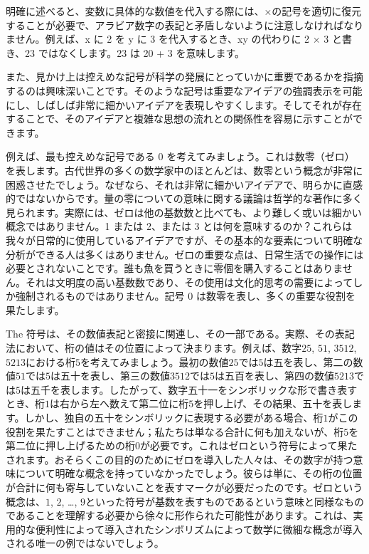 \documentclass[a4paper,11pt,openany]{ltjsbook}
\begin{document}
明確に述べると、変数に具体的な数値を代入する際には、×の記号を適切に復元することが必要で、アラビア数字の表記と矛盾しないように注意しなければなりません。例えば、x に 2 を y に 3 を代入するとき、xy の代わりに 2 × 3 と書き、23 ではなくします。23 は 20 + 3 を意味します。

また、見かけ上は控えめな記号が科学の発展にとっていかに重要であるかを指摘するのは興味深いことです。そのような記号は重要なアイデアの強調表示を可能にし、しばしば非常に細かいアイデアを表現しやすくします。そしてそれが存在することで、そのアイデアと複雑な思想の流れとの関係性を容易に示すことができます。

例えば、最も控えめな記号である 0 を考えてみましょう。これは数零（ゼロ）を表します。古代世界の多くの数学家中のほとんどは、数零という概念が非常に困惑させたでしょう。なぜなら、それは非常に細かいアイデアで、明らかに直感的ではないからです。量の零についての意味に関する議論は哲学的な著作に多く見られます。実際には、ゼロは他の基数数と比べても、より難しく或いは細かい概念ではありません。1 または 2、または 3 とは何を意味するのか？これらは我々が日常的に使用しているアイデアですが、その基本的な要素について明確な分析ができる人は多くはありません。ゼロの重要な点は、日常生活での操作には必要とされないことです。誰も魚を買うときに零個を購入することはありません。それは文明度の高い基数数であり、その使用は文化的思考の需要によってしか強制されるものではありません。記号 0 は数零を表し、多くの重要な役割を果たします。

The 符号は、その数値表記と密接に関連し、その一部である。実際、その表記法において、桁の値はその位置によって決まります。例えば、数字$25$, $51$, $3512$, $5213$における桁$5$を考えてみましょう。最初の数値$25$では$5$は五を表し、第二の数値$51$では$5$は五十を表し、第三の数値$3512$では$5$は五百を表し、第四の数値$5213$では$5$は五千を表します。したがって、数字五十一をシンボリックな形で書き表すとき、桁$1$は右から左へ数えて第二位に桁$5$を押し上げ、その結果、五十を表します。しかし、独自の五十をシンボリックに表現する必要がある場合、桁$1$がこの役割を果たすことはできません；私たちは単なる合計に何も加えないが、桁$5$を第二位に押し上げるための桁$0$が必要です。これはゼロという符号によって果たされます。おそらくこの目的のためにゼロを導入した人々は、その数字が持つ意味について明確な概念を持っていなかったでしょう。彼らは単に、その桁の位置が合計に何も寄与していないことを表すマークが必要だったのです。ゼロという概念は、$1$, $2$, \dots, $9$といった符号が基数を表すものであるという意味と同様なものであることを理解する必要から徐々に形作られた可能性があります。これは、実用的な便利性によって導入されたシンボリズムによって数学に微細な概念が導入される唯一の例ではないでしょう。
\end{document}

